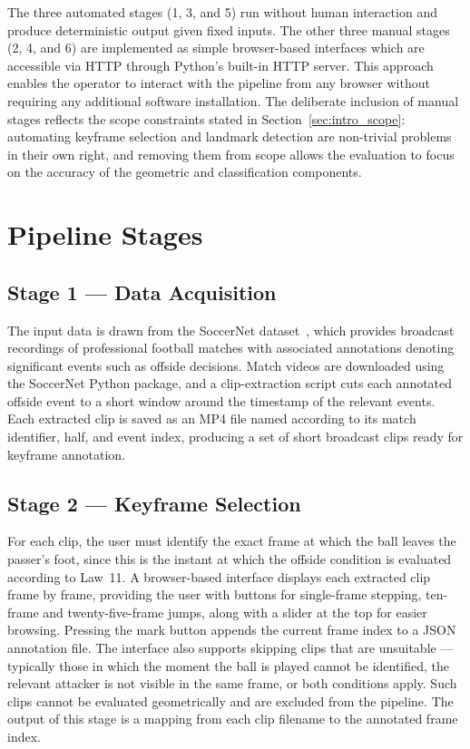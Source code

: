 The three automated stages (1, 3, and 5) run without human interaction and produce deterministic output given fixed inputs. The other three manual stages (2, 4, and 6) are implemented as simple browser-based interfaces which are accessible via HTTP through Python's built-in HTTP server. This approach enables the operator to interact with the pipeline from any browser without requiring any additional software installation. The deliberate inclusion of manual stages reflects the scope constraints stated in Section~\ref{sec:intro_scope}: automating keyframe selection and landmark detection are non-trivial problems in their own right, and removing them from scope allows the evaluation to focus on the accuracy of the geometric and classification components.

\section{Pipeline Stages}%
\label{sec:design_stages}

\subsection{Stage 1 — Data Acquisition}%
\label{sec:design_acq}

The input data is drawn from the SoccerNet dataset~\cite{giancola2018soccernet,deliegev2soccernet}, which provides broadcast recordings of professional football matches with associated annotations denoting significant events such as offside decisions. Match videos are downloaded using the SoccerNet Python package, and a clip-extraction script cuts each annotated offside event to a short window around the timestamp of the relevant events. Each extracted clip is saved as an MP4 file named according to its match identifier, half, and event index, producing a set of short broadcast clips ready for keyframe annotation.

\subsection{Stage 2 — Keyframe Selection}%
\label{sec:design_keyframe}

For each clip, the user must identify the exact frame at which the ball leaves the passer's foot, since this is the instant at which the offside condition is evaluated according to Law~11. A browser-based interface displays each extracted clip frame by frame, providing the user with buttons for single-frame stepping, ten-frame and twenty-five-frame jumps, along with a slider at the top for easier browsing. Pressing the mark button appends the current frame index to a JSON annotation file. The interface also supports skipping clips that are unsuitable — typically those in which the moment the ball is played cannot be identified, the relevant attacker is not visible in the same frame, or both conditions apply. Such clips cannot be evaluated geometrically and are excluded from the pipeline. The output of this stage is a mapping from each clip filename to the annotated frame index.

